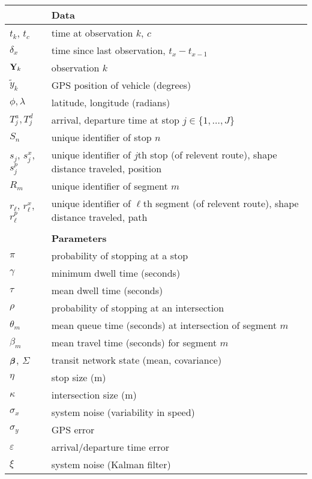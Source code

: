 \documentclass[draftcls,a4paper,onecolumn]{IEEEtran}\usepackage[]{graphicx}\usepackage[]{color}
\begin{document}





\begin{xtabular}{ll}
  \toprule
  &\textbf{Data} \\ \midrule
  $t_k$, $t_c$ & time at observation $k$, $c$ \\
  $\delta_x$ & time since last observation, $t_x - t_{x-1}$\\
  $\mathbf{Y}_k$ & observation $k$ \\
  $\tilde y_k$ & GPS position of vehicle (degrees) \\
  $\phi,\lambda$ & latitude, longitude (radians) \\
  $T^a_j, T^d_j$ & arrival, departure time at stop $j \in \{1, \ldots, J\}$ \\
  $S_n$ & unique identifier of stop $n$ \\
  $s_j$, $s_j^x$, $s_j^p$ & unique identifier of $j$th stop (of relevent route), shape distance traveled, position \\
  $R_m$ & unique identifier of segment $m$  \\
  $r_\ell$, $r_\ell^x$, $r_\ell^p$ & unique identifier of $\ell$th segment (of relevent route), shape distance traveled, path \\
  \bottomrule
  \\ \toprule
  &\textbf{Parameters} \\ \midrule
  $\pi$ & probability of stopping at a stop \\
  $\gamma$ & minimum dwell time (seconds) \\
  $\tau$ & mean dwell time (seconds) \\
  $\rho$ & probability of stopping at an intersection \\
  $\theta_m$ & mean queue time (seconds) at intersection of segment $m$ \\
  $\beta_m$ & mean travel time (seconds) for segment $m$ \\
  $\boldsymbol{\beta}$, $\Sigma$ & transit network state (mean, covariance) \\
  $\eta$ & stop size (m) \\
  $\kappa$ & intersection size (m) \\
  $\sigma_x$ & system noise (variability in speed) \\
  $\sigma_y$ & GPS error \\
  $\varepsilon$ & arrival/departure time error \\
  $\xi$ & system noise (Kalman filter) \\

\end{xtabular}
\end{document}
